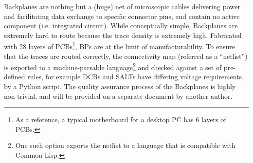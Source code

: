 Backplanes are nothing but a (huge) net of microscopic cables delivering power
and facilitating data exchange to specific connector pins, and contain no active
component (i.e. integrated circuit).
While conceptually simple, Backplanes are extremely hard to route because the
trace density is extremely high.
Fabricated with 28 layers of PCBs\footnote{
    As a reference, a typical motherboard for a desktop PC has 6 layers of PCBs.
}, BPs are at the limit of manufacturability.
To ensure that the traces are routed correctly,
the connectivity map (referred as a ``netlist'') is exported to a
machine-parsable language\footnote{
    One such option exports the netlist to a language that is compatible with
    Common Lisp.
} and checked against a set of pre-defined rules, for example DCBs and
SALTs have differing voltage requirements,
by a Python script.
The quality assurance process of the Backplanes is highly non-trivial, and will
be provided on a separate document by another author.

